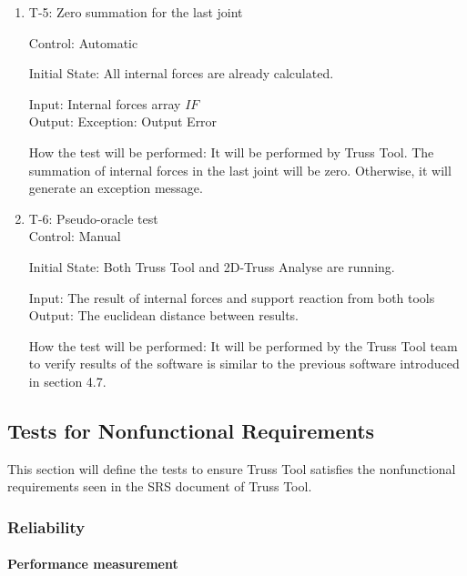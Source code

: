 \documentclass[12pt, titlepage]{article}
\begin{document}
\begin{enumerate}

\item{T-5: Zero summation for the last joint\\}

Control: Automatic
					
Initial State: All internal forces are already calculated.
					
Input: Internal forces array $IF$\\
					
Output: Exception: Output Error
					
How the test will be performed: It will be performed by Truss Tool. The summation of internal forces in the last joint will be zero. Otherwise, it will generate an exception message.
\item{T-6: Pseudo-oracle test\\}
Control: Manual
					
Initial State: Both Truss Tool and 2D-Truss Analyse are running.
					
Input: The result of internal forces and support reaction from both tools \\
					
Output:  The euclidean distance between results.
					
How the test will be performed: It will be performed by the Truss Tool team to verify results of the software is similar to the previous software introduced in section 4.7.

\end{enumerate}

\subsection{Tests for Nonfunctional Requirements}
This section will define the tests to ensure Truss Tool satisfies the nonfunctional requirements seen in the SRS document of Truss Tool. 
\subsubsection{Reliability}


		
\paragraph{Performance measurement}
\end{document}
